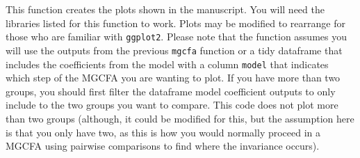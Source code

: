 \documentclass[
  man]{apa7}
\begin{document}
This function creates the plots shown in the manuscript. You will need the libraries listed for this function to work. Plots may be modified to rearrange for those who are familiar with \texttt{ggplot2}. Please note that the function assumes you will use the outputs from the previous \texttt{mgcfa} function or a tidy dataframe that includes the coefficients from the model with a column \texttt{model} that indicates which step of the MGCFA you are wanting to plot. If you have more than two groups, you should first filter the dataframe model coefficient outputs to only include to the two groups you want to compare. This code does not plot more than two groups (although, it could be modified for this, but the assumption here is that you only have two, as this is how you would normally proceed in a MGCFA using pairwise comparisons to find where the invariance occurs).

\small
\end{document}
